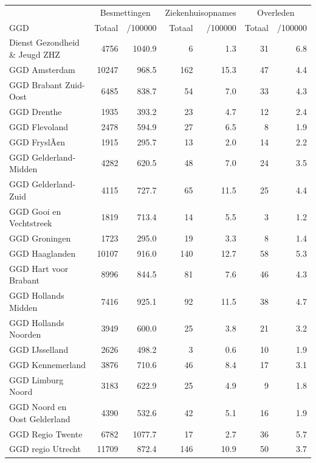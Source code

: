 \documentclass[
  english,
  man,floatsintext]{apa6}
\begin{document}
\begin{table}[H]
\centering\begingroup\fontsize{10}{12}\selectfont

\begin{threeparttable}
\begin{tabular}{lrrrrrr}
\toprule
\multicolumn{1}{c}{ } & \multicolumn{2}{c}{Besmettingen} & \multicolumn{2}{c}{Ziekenhuisopnames} & \multicolumn{2}{c}{Overleden} \\
\cmidrule(l{3pt}r{3pt}){2-3} \cmidrule(l{3pt}r{3pt}){4-5} \cmidrule(l{3pt}r{3pt}){6-7}
GGD & Totaal & /100000 & Totaal & /100000 & Totaal & /100000\\
\midrule
Dienst Gezondheid \& Jeugd ZHZ & 4756 & 1040.9 & 6 & 1.3 & 31 & 6.8\\
GGD Amsterdam & 10247 & 968.5 & 162 & 15.3 & 47 & 4.4\\
GGD Brabant Zuid-Oost & 6485 & 838.7 & 54 & 7.0 & 33 & 4.3\\
GGD Drenthe & 1935 & 393.2 & 23 & 4.7 & 12 & 2.4\\
GGD Flevoland & 2478 & 594.9 & 27 & 6.5 & 8 & 1.9\\
GGD FryslÃ¢n & 1915 & 295.7 & 13 & 2.0 & 14 & 2.2\\
GGD Gelderland-Midden & 4282 & 620.5 & 48 & 7.0 & 24 & 3.5\\
GGD Gelderland-Zuid & 4115 & 727.7 & 65 & 11.5 & 25 & 4.4\\
GGD Gooi en Vechtstreek & 1819 & 713.4 & 14 & 5.5 & 3 & 1.2\\
GGD Groningen & 1723 & 295.0 & 19 & 3.3 & 8 & 1.4\\
GGD Haaglanden & 10107 & 916.0 & 140 & 12.7 & 58 & 5.3\\
GGD Hart voor Brabant & 8996 & 844.5 & 81 & 7.6 & 46 & 4.3\\
GGD Hollands Midden & 7416 & 925.1 & 92 & 11.5 & 38 & 4.7\\
GGD Hollands Noorden & 3949 & 600.0 & 25 & 3.8 & 21 & 3.2\\
GGD IJsselland & 2626 & 498.2 & 3 & 0.6 & 10 & 1.9\\
GGD Kennemerland & 3876 & 710.6 & 46 & 8.4 & 17 & 3.1\\
GGD Limburg Noord & 3183 & 622.9 & 25 & 4.9 & 9 & 1.8\\
GGD Noord en Oost Gelderland & 4390 & 532.6 & 42 & 5.1 & 16 & 1.9\\
GGD Regio Twente & 6782 & 1077.7 & 17 & 2.7 & 36 & 5.7\\
GGD regio Utrecht & 11709 & 872.4 & 146 & 10.9 & 50 & 3.7\\

\end{tabular}
\end{threeparttable}
\end{table}
\end{document}
